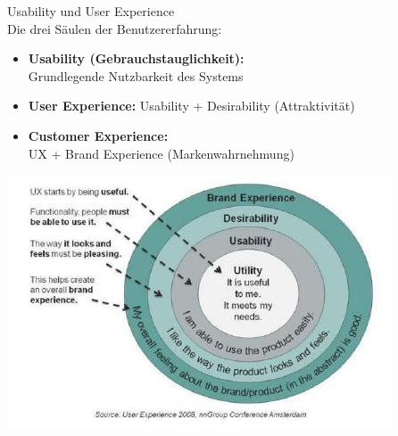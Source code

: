 \begin{concept}{Usability und User Experience}\\
Die drei Säulen der Benutzererfahrung:
\begin{itemize}
    \item \textbf{Usability (Gebrauchstauglichkeit):} \\ Grundlegende Nutzbarkeit des Systems
    \item \textbf{User Experience:} Usability + Desirability (Attraktivität)
    \item \textbf{Customer Experience:} \\ UX + Brand Experience (Markenwahrnehmung)
\end{itemize}
\includegraphics[width=0.9\linewidth]{images/2024_12_29_0d1d7b5551ea1b4b41bdg-02}
\end{concept}

